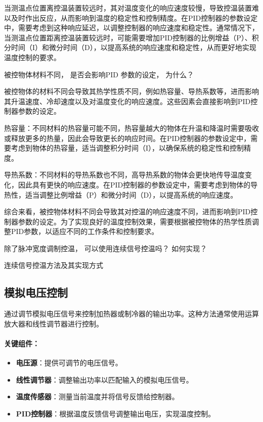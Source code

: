 \documentclass[dvipsnames, svgnames,a4paper,11pt]{article}
\begin{document}
当测温点位置离控温装置较远时，其对温度变化的响应速度较慢，导致控温装置难以及时作出反应，从而影响到温度的稳定性和控制精度。在PID控制器的参数设定中，需要考虑到这种响应延迟，以调整控制器的响应速度和稳定性。通常情况下，当测温点位置距离控温装置较远时，可能需要增加PID控制器的比例增益（P）、积分时间（I）和微分时间（D），以提高系统的响应速度和稳定性，从而更好地实现温度控制的要求。
			
			
			
			
	
		\begin{question}
			被控物体材料不同， 是否会影响PID 参数的设定， 为什么？
		\end{question} 
			
		被控物体的材料不同会导致其热学性质不同，例如热容量、导热系数等，进而影响其升温速度、冷却速度以及对温度变化的响应速度。这些因素会直接影响到PID控制器参数的设定。

热容量：不同材料的热容量可能不同，热容量越大的物体在升温和降温时需要吸收或释放更多的热量，因此会导致更长的响应时间。在PID控制器的参数设定中，需要考虑到物体的热容量，适当调整积分时间（I），以确保系统的稳定性和控制精度。

导热系数：不同材料的导热系数也不同，高导热系数的物体会更快地传导温度变化，因此具有更快的响应速度。在PID控制器的参数设定中，需要考虑到物体的导热性，适当调整比例增益（P）和微分时间（D），以提高系统的响应速度。

综合来看，被控物体材料不同会导致其对控温的响应速度不同，进而影响到PID控制器参数的设定。为了实现良好的温度控制效果，需要根据被控物体的热学性质调整PID参数，以适应不同的工作条件和控制要求。
	
\begin{question}
	除了脉冲宽度调制控温， 可以使用连续信号控温吗？ 如何实现？
\end{question}
连续信号控温方法及其实现方式

\subsection*{模拟电压控制}

通过调节模拟电压信号来控制加热器或制冷器的输出功率。这种方法通常使用运算放大器和线性调节器进行控制。

\paragraph*{关键组件：}
\begin{itemize}
    \item \textbf{电压源}：提供可调节的电压信号。
    \item \textbf{线性调节器}：调整输出功率以匹配输入的模拟电压信号。
    \item \textbf{温度传感器}：测量当前温度并将信号反馈给控制器。
    \item \textbf{PID控制器}：根据温度反馈信号调整输出电压，实现温度控制。
\end{itemize}
\end{document}
